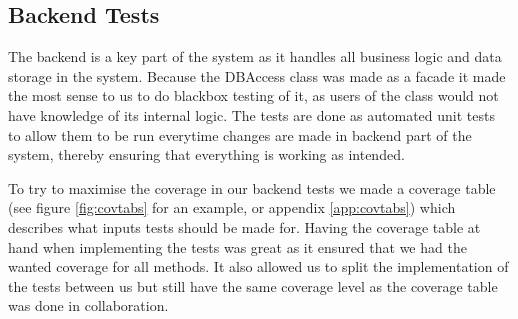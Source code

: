 \subsection{Backend Tests}
The backend is a key part of the system as it handles all business logic and data storage in the system. Because 
the DBAccess class was made as a facade it made the most sense to us to do blackbox testing of it, as users of
the class would not have knowledge of its internal logic. The tests are done as automated unit tests to allow them
to be run everytime changes are made in backend part of the system, thereby ensuring that everything is working as
intended.

To try to maximise the coverage in our backend tests we made a coverage table (see figure \ref{fig:covtabs} for an example,
or appendix \ref{app:covtabs}) which describes what inputs tests should be made for. Having the coverage table at hand
when implementing the tests was great as it ensured that we had the wanted coverage for all methods. It also allowed us
 to split the implementation of the tests between us but still have the same coverage level as the coverage table was done
 in collaboration.

  
